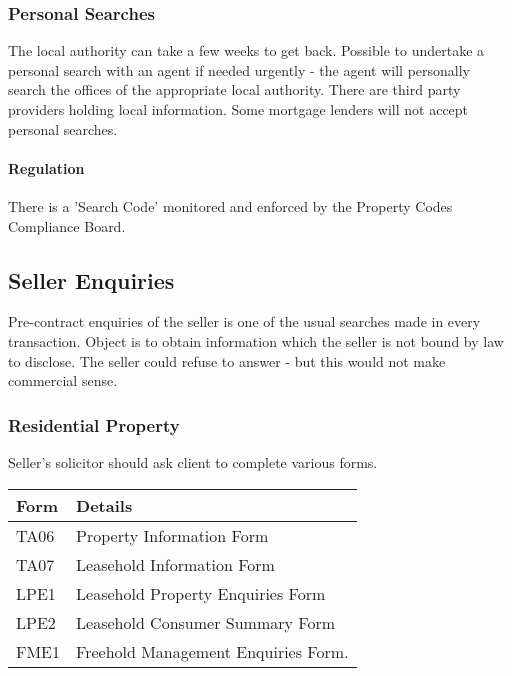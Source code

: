 \documentclass[
]{article}
\begin{document}
\hypertarget{personal-searches}{%
\subsubsection{Personal Searches}\label{personal-searches}}

The local authority can take a few weeks to get back. Possible to
undertake a personal search with an agent if needed urgently - the agent
will personally search the offices of the appropriate local authority.
There are third party providers holding local information. Some mortgage
lenders will not accept personal searches.

\hypertarget{regulation}{%
\paragraph{Regulation}\label{regulation}}

There is a 'Search Code' monitored and enforced by the Property Codes
Compliance Board.

\hypertarget{seller-enquiries}{%
\subsection{Seller Enquiries}\label{seller-enquiries}}

Pre-contract enquiries of the seller is one of the usual searches made
in every transaction. Object is to obtain information which the seller
is not bound by law to disclose. The seller could refuse to answer - but
this would not make commercial sense.

\hypertarget{residential-property}{%
\subsubsection{Residential Property}\label{residential-property}}

Seller's solicitor should ask client to complete various forms.

\begin{longtable}[]{@{}ll@{}}
\toprule()
Form & Details \\
\midrule()
\endhead
TA06 & Property Information Form \\
TA07 & Leasehold Information Form \\
LPE1 & Leasehold Property Enquiries Form \\
LPE2 & Leasehold Consumer Summary Form \\
FME1 & Freehold Management Enquiries Form. \\
\bottomrule()
\end{longtable}
\end{document}
